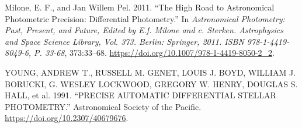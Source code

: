 \documentclass[]{elsarticle} %
\begin{document}
\leavevmode\hypertarget{ref-Milone2011}{}%
Milone, E. F., and Jan Willem Pel. 2011. ``The High Road to Astronomical
Photometric Precision: Differential Photometry.'' In \emph{Astronomical
Photometry: Past, Present, and Future, Edited by E.f. Milone and c.
Sterken. Astrophysics and Space Science Library, Vol. 373. Berlin:
Springer, 2011. ISBN 978-1-4419-8049-6, P. 33-68}, 373:33--68.
\url{https://doi.org/10.1007/978-1-4419-8050-2_2}.

\leavevmode\hypertarget{ref-YOUNG1991}{}%
YOUNG, ANDREW T., RUSSELL M. GENET, LOUIS J. BOYD, WILLIAM J. BORUCKI,
G. WESLEY LOCKWOOD, GREGORY W. HENRY, DOUGLAS S. HALL, et al. 1991.
``PRECISE AUTOMATIC DIFFERENTIAL STELLAR PHOTOMETRY.'' Astronomical
Society of the Pacific. \url{https://doi.org/10.2307/40679676}.
\end{document}
